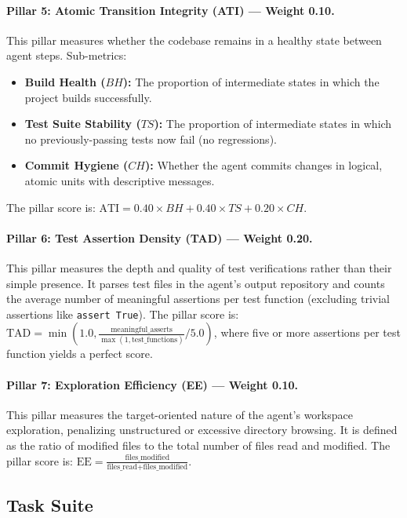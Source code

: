 \documentclass[letterpaper, 10 pt, conference]{ieeeconf}
\begin{document}
\paragraph{Pillar 5: Atomic Transition Integrity (ATI) --- Weight 0.10.}
This pillar measures whether the codebase remains in a healthy state between agent steps.
Sub-metrics:
\begin{itemize}[leftmargin=*,itemsep=1pt]
  \item \textbf{Build Health ($BH$):} The proportion of intermediate states in which the project builds successfully.
  \item \textbf{Test Suite Stability ($TS$):} The proportion of intermediate states in which no previously-passing tests now fail (no regressions).
  \item \textbf{Commit Hygiene ($CH$):} Whether the agent commits changes in logical, atomic units with descriptive messages.
\end{itemize}

The pillar score is:
$\mathrm{ATI} = 0.40 \times BH + 0.40 \times TS + 0.20 \times CH$.

\paragraph{Pillar 6: Test Assertion Density (TAD) --- Weight 0.20.}
This pillar measures the depth and quality of test verifications rather than their simple presence.
It parses test files in the agent's output repository and counts the average number of meaningful assertions per test function (excluding trivial assertions like \texttt{assert True}).
The pillar score is:
$\mathrm{TAD} = \min\left(1.0, \frac{\text{meaningful\_asserts}}{\max(1, \text{test\_functions})} \Big/ 5.0\right)$, where five or more assertions per test function yields a perfect score.

\paragraph{Pillar 7: Exploration Efficiency (EE) --- Weight 0.10.}
This pillar measures the target-oriented nature of the agent's workspace exploration, penalizing unstructured or excessive directory browsing.
It is defined as the ratio of modified files to the total number of files read and modified.
The pillar score is:
$\mathrm{EE} = \frac{\text{files\_modified}}{\text{files\_read} + \text{files\_modified}}$.

\subsection{Task Suite}
\label{sec:tasks}
\end{document}
